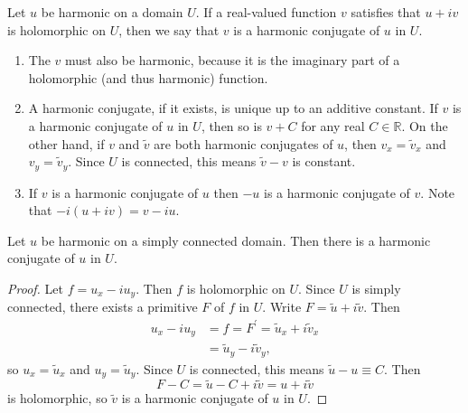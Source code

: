 \begin{defn}
Let $u$ be harmonic on a domain $U$. If a real-valued function $v$
satisfies that $u + iv$ is holomorphic on $U$, then we say that
$v$ is a harmonic conjugate of $u$ in $U$.
\end{defn}

\begin{remark}
  \begin{enumerate}
    \item{
      The $v$ must also be harmonic, because it is the imaginary part
      of a holomorphic (and thus harmonic) function.
    }
    \item{
      A harmonic conjugate, if it exists, is unique up to an additive
      constant. If $v$ is a harmonic conjugate of $u$ in $U$, then so
      is $v + C$ for any real $C \in \mathbb{R}$. On the other hand,
      if $v$ and $\tilde{v}$ are both harmonic conjugates of $u$, then
      $v_x = \tilde{v}_x$ and $v_y = \tilde{v}_y$. Since $U$ is connected,
      this means $\tilde{v} - v$ is constant.
    }
    \item{
      If $v$ is a harmonic conjugate of $u$ then $-u$ is a harmonic
      conjugate of $v$. Note that $-i(u + iv) = v - iu$.
    }
  \end{enumerate}
\end{remark}

\begin{theorem}
Let $u$ be harmonic on a simply connected domain. Then there is a harmonic
conjugate of $u$ in $U$.
\end{theorem}

\begin{proof}
Let $f = u_x - i u_y$. Then $f$ is holomorphic on $U$. Since $U$ is simply
connected, there exists a primitive $F$ of $f$ in $U$. Write
$F = \tilde{u} + i \tilde{v}$. Then
\begin{align*}
   u_x - i u_y
&= f = F^\prime
 = \tilde{u}_x + i \tilde{v}_x \\
&= \tilde{u}_y - i \tilde{v}_y,
\end{align*}
so $u_x = \tilde{u}_x$ and
$u_y = \tilde{u}_y$. Since $U$ is connected,
this means $\tilde{u} - u \equiv C$. Then
$$
  F - C
= \tilde{u} - C + i \tilde{v}
= u + i \tilde{v}
$$
is holomorphic, so $\tilde{v}$ is a harmonic
conjugate of $u$ in $U$.
\end{proof}

